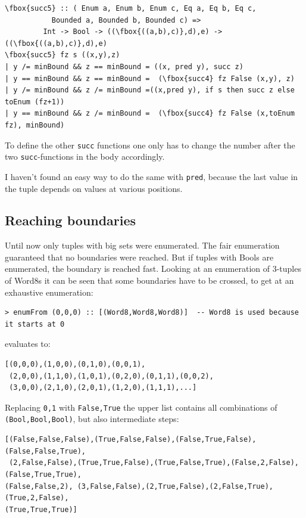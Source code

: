 \documentclass{tmr}
\begin{document}

\begin{Verbatim}[commandchars=\\\{\}]
\fbox{succ5} :: ( Enum a, Enum b, Enum c, Eq a, Eq b, Eq c,
           Bounded a, Bounded b, Bounded c) =>
         Int -> Bool -> ((\fbox{((a,b),c)},d),e) -> ((\fbox{((a,b),c)},d),e)
\fbox{succ5} fz s ((x,y),z)
| y /= minBound && z == minBound = ((x, pred y), succ z)
| y == minBound && z == minBound =  (\fbox{succ4} fz False (x,y), z)
| y /= minBound && z /= minBound =((x,pred y), if s then succ z else toEnum (fz+1))
| y == minBound && z /= minBound =  (\fbox{succ4} fz False (x,toEnum fz), minBound)
\end{Verbatim}
To define the other \verb|succ| functions one only has to change the number after the two \verb|succ|-functions in the body accordingly. 

I haven't found an easy way to do the same with \verb|pred|, because the last value in the tuple depends on values at various positions.

\subsection{Reaching boundaries}
Until now only tuples with big sets were enumerated. The fair enumeration guaranteed that no boundaries were reached. But if tuples with Bools are enumerated, the boundary is reached fast. Looking at an enumeration of 3-tuples of Word8s it can be seen that some boundaries have to be crossed, to get at an exhaustive enumeration:

\begin{Verbatim}
> enumFrom (0,0,0) :: [(Word8,Word8,Word8)]  -- Word8 is used because it starts at 0
\end{Verbatim}

evaluates to:

\begin{Verbatim}
[(0,0,0),(1,0,0),(0,1,0),(0,0,1),
 (2,0,0),(1,1,0),(1,0,1),(0,2,0),(0,1,1),(0,0,2),
 (3,0,0),(2,1,0),(2,0,1),(1,2,0),(1,1,1),...]
\end{Verbatim}
Replacing \verb|0,1| with \verb|False,True| the upper list contains all combinations of \verb|(Bool,Bool,Bool)|, but also intermediate steps:
\begin{Verbatim}
[(False,False,False),(True,False,False),(False,True,False),(False,False,True),
 (2,False,False),(True,True,False),(True,False,True),(False,2,False),(False,True,True),
(False,False,2), (3,False,False),(2,True,False),(2,False,True),(True,2,False),
(True,True,True)]
\end{Verbatim}
\end{document}
